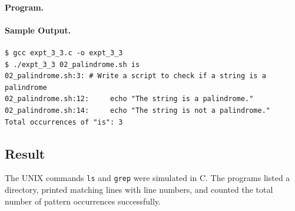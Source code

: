 \paragraph{Program.}


\paragraph{Sample Output.}
\begin{lstlisting}[style=outputstyle, caption={Counting occurrences of the pattern \texttt{is}}]
$ gcc expt_3_3.c -o expt_3_3
$ ./expt_3_3 02_palindrome.sh is
02_palindrome.sh:3: # Write a script to check if a string is a
palindrome
02_palindrome.sh:12:     echo "The string is a palindrome."
02_palindrome.sh:14:     echo "The string is not a palindrome."
Total occurrences of "is": 3
\end{lstlisting}

\subsection*{Result}
The UNIX commands \texttt{ls} and \texttt{grep} were simulated in C. The programs listed a directory, printed matching lines with line numbers, and counted the total number of pattern occurrences successfully.
